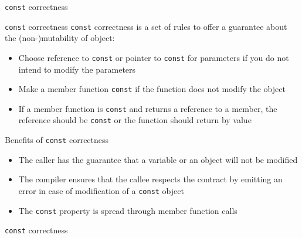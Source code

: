 \begin{frame}{\texttt{const} correctness}{}
  \begin{block}{\texttt{const} correctness}
    \lstinline!const! correctness is a set of rules to offer a guarantee about the (non-)mutability of object:
    \begin{itemize}
    \item
      Choose reference to \lstinline!const! or pointer to \lstinline!const! for parameters if you do not intend to modify the parameters
    \item
      Make a member function \lstinline!const! if the function does not modify the object
    \item
      If a member function is \lstinline!const! and returns a reference to a member, the reference should be \lstinline!const! or the function should return by value
    \end{itemize}
  \end{block}

  \begin{block}{Benefits of \texttt{const} correctness}
    \begin{itemize}
    \item
      The caller has the guarantee that a variable or an object will not be modified
    \item
      The compiler ensures that the callee respects the contract by emitting an error in case of modification of a \lstinline!const! object
    \item
      The \lstinline!const! property is spread through member function calls
    \end{itemize}
  \end{block}
\end{frame}

\begin{frame}{\texttt{const} correctness}{}
  \begin{example}
  \end{example}
\end{frame}



